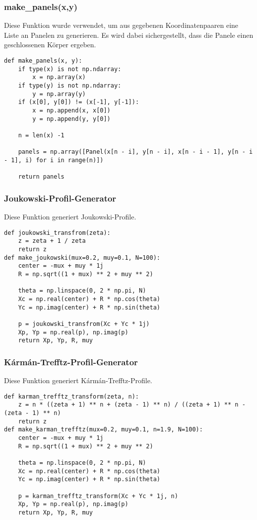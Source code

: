 \subsubsection{make\_panels(x,y)}
Diese Funktion wurde verwendet, um aus gegebenen Koordinatenpaaren eine Liste an Panelen zu generieren. Es wird dabei sichergestellt, dass die Panele einen geschlossenen Körper ergeben.
\begin{lstlisting}
def make_panels(x, y):
    if type(x) is not np.ndarray:
        x = np.array(x)
    if type(y) is not np.ndarray:
        y = np.array(y)
    if (x[0], y[0]) != (x[-1], y[-1]):
        x = np.append(x, x[0])
        y = np.append(y, y[0])
        
    n = len(x) -1

    panels = np.array([Panel(x[n - i], y[n - i], x[n - i - 1], y[n - i - 1], i) for i in range(n)])
    
    return panels
\end{lstlisting}

\subsubsection{Joukowski-Profil-Generator}
Diese Funktion generiert Joukowski-Profile.
\begin{lstlisting}
def joukowski_transfrom(zeta):
    z = zeta + 1 / zeta
    return z
def make_joukowski(mux=0.2, muy=0.1, N=100):
    center = -mux + muy * 1j 
    R = np.sqrt((1 + mux) ** 2 + muy ** 2)

    theta = np.linspace(0, 2 * np.pi, N)
    Xc = np.real(center) + R * np.cos(theta)
    Yc = np.imag(center) + R * np.sin(theta)

    p = joukowski_transfrom(Xc + Yc * 1j)
    Xp, Yp = np.real(p), np.imag(p)
    return Xp, Yp, R, muy
\end{lstlisting}

\subsubsection{Kármán-Trefftz-Profil-Generator}
Diese Funktion generiert Kármán-Trefftz-Profile.
\begin{lstlisting}
def karman_trefftz_transform(zeta, n):
    z = n * ((zeta + 1) ** n + (zeta - 1) ** n) / ((zeta + 1) ** n - (zeta - 1) ** n)
    return z
def make_karman_trefftz(mux=0.2, muy=0.1, n=1.9, N=100):
    center = -mux + muy * 1j
    R = np.sqrt((1 + mux) ** 2 + muy ** 2) 

    theta = np.linspace(0, 2 * np.pi, N)
    Xc = np.real(center) + R * np.cos(theta)
    Yc = np.imag(center) + R * np.sin(theta)

    p = karman_trefftz_transform(Xc + Yc * 1j, n)
    Xp, Yp = np.real(p), np.imag(p)
    return Xp, Yp, R, muy
\end{lstlisting}


